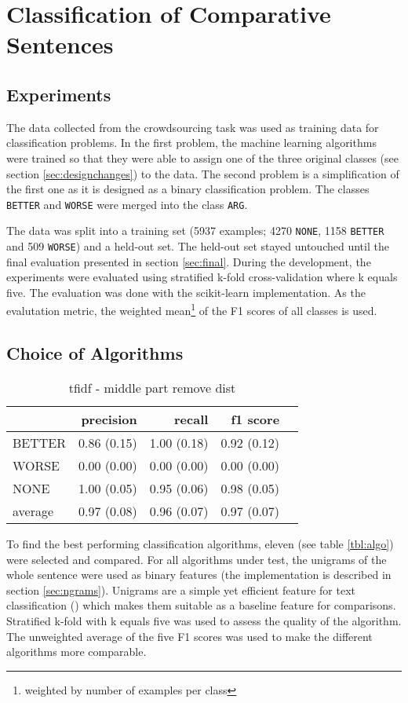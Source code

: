 \chapter{Classification of Comparative Sentences}
\section{Experiments}
The data collected from the crowdsourcing task was used as training data for classification problems. In the first problem, the machine learning algorithms were trained so that they were able to assign one of the three original classes (see section \ref{sec:designchanges}) to the data. The second problem is a simplification of the first one as it is designed as a binary classification problem. The classes \texttt{BETTER} and \texttt{WORSE} were merged into the class \texttt{ARG}.


The data was split into a training set (5937 examples; 4270 \texttt{NONE}, 1158 \texttt{BETTER} and 509 \texttt{WORSE}) and a held-out set. The held-out set stayed untouched until the final evaluation presented in section \ref{sec:final}. During the development, the experiments were evaluated using stratified k-fold cross-validation where k equals five. The evaluation was done with the scikit-learn implementation. As the evalutation metric, the weighted mean\footnote{weighted by number of examples per class} of the F1 scores of all classes is used. 

\section{Choice of Algorithms}

\begin{table}[h] 
 \centering 
 \caption{ tfidf - middle part remove dist } 
 \label{  }\begin{tabular}{@{}lrrrr@{}}
\toprule
 	&	 precision &	 recall &	 f1 score  \\ \midrule 
BETTER	&	 0.86 (0.15) &	 1.00 (0.18) &	 0.92 (0.12)  \\ 
WORSE	&	 0.00 (0.00) &	 0.00 (0.00) &	 0.00 (0.00)  \\ 
NONE	&	 1.00 (0.05) &	 0.95 (0.06) &	 0.98 (0.05)  \\ 
average	&	 0.97 (0.08) &	 0.96 (0.07) &	 0.97 (0.07)  \\ 
\bottomrule
\end{tabular}
\end{table}

To find the best performing classification algorithms, eleven (see table \ref{tbl:algo}) were selected and compared. For all algorithms under test, the unigrams of the whole sentence were used as binary features (the implementation is described in section \ref{sec:ngrams}). Unigrams are a simple yet efficient feature for text classification (\cite{cavnar1994n}) which makes them suitable as a baseline feature for comparisons. Stratified k-fold with k equals five was used to assess the quality of the algorithm. The unweighted average of the five F1 scores was used to make the different algorithms more comparable.

